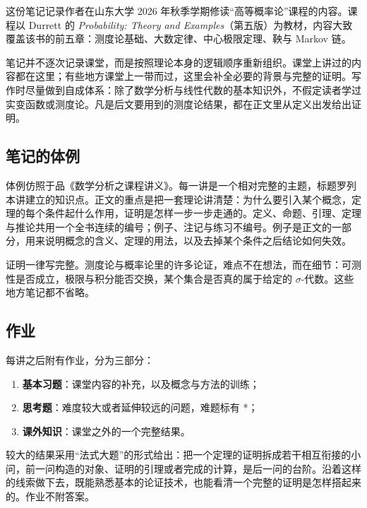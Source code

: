 
这份笔记记录作者在山东大学 2026 年秋季学期修读“高等概率论”课程的内容。课程以 Durrett 的 \emph{Probability: Theory and Examples}（第五版）为教材，内容大致覆盖该书的前五章：测度论基础、大数定律、中心极限定理、鞅与 Markov 链。

笔记并不逐次记录课堂，而是按照理论本身的逻辑顺序重新组织。课堂上讲过的内容都在这里；有些地方课堂上一带而过，这里会补全必要的背景与完整的证明。写作时尽量做到自成体系：除了数学分析与线性代数的基本知识外，不假定读者学过实变函数或测度论。凡是后文要用到的测度论结果，都在正文里从定义出发给出证明。

\subsection*{笔记的体例}

体例仿照于品《数学分析之课程讲义》。每一讲是一个相对完整的主题，标题罗列本讲建立的知识点。正文的重点是把一套理论讲清楚：为什么要引入某个概念，定理的每个条件起什么作用，证明是怎样一步一步走通的。定义、命题、引理、定理与推论共用一个全书连续的编号；例子、注记与练习不编号。例子是正文的一部分，用来说明概念的含义、定理的用法，以及去掉某个条件之后结论如何失效。

证明一律写完整。测度论与概率论里的许多论证，难点不在想法，而在细节：可测性是否成立，极限与积分能否交换，某个集合是否真的属于给定的 $\sigma$-代数。这些地方笔记都不省略。

\subsection*{作业}

每讲之后附有作业，分为三部分：
\begin{enumerate}
  \item \textbf{基本习题}：课堂内容的补充，以及概念与方法的训练；
  \item \textbf{思考题}：难度较大或者延伸较远的问题，难题标有 *；
  \item \textbf{课外知识}：课堂之外的一个完整结果。
\end{enumerate}
较大的结果采用“法式大题”的形式给出：把一个定理的证明拆成若干相互衔接的小问，前一问构造的对象、证明的引理或者完成的计算，是后一问的台阶。沿着这样的线索做下去，既能熟悉基本的论证技术，也能看清一个完整的证明是怎样搭起来的。作业不附答案。
